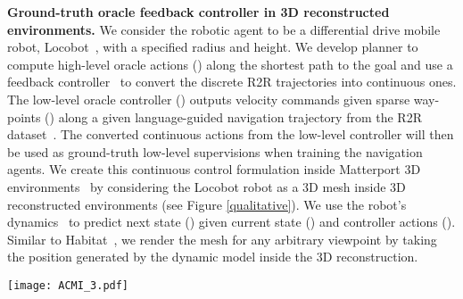 \documentclass[letter, 10pt, conference]{ieeeconf}
\begin{document}
\textbf{Ground-truth oracle feedback controller in 3D reconstructed environments.}
We consider the robotic agent to be a differential drive mobile robot, Locobot~\cite{pyrobot2019}, with a specified radius and height. We develop  planner to compute high-level oracle actions () along the shortest path to the goal and use a feedback controller~\cite{9780133496598} to convert the discrete R2R trajectories \cite{mattersim} into continuous ones.
The low-level oracle controller () outputs velocity commands  given sparse way-points () along a given language-guided navigation trajectory from the R2R dataset~\cite{Matterport3D}.
The converted continuous actions from the low-level controller will then be used as ground-truth low-level supervisions  when training the navigation agents.
We create this continuous control formulation inside Matterport 3D environments~\cite{Matterport3D} by considering the Locobot robot as a 3D mesh inside 3D reconstructed environments (see Figure \ref{qualitative}).
We use the robot's dynamics~\cite{10.5555/1855026} to predict next state () given current state () and controller actions (). 
Similar to Habitat~\cite{habitat19iccv}, we render the mesh for any arbitrary viewpoint by taking the position generated by the dynamic model inside the 3D reconstruction.

\begin{comment}
\begin{figure}[t!]
\centering
\texttt{[image: navigable.pdf]}
\label{navigable}
\caption{Exploration of environment using optimal control supervisions}
\end{figure}
\end{comment}

\begin{figure*}[t!]
\centering
\texttt{[image: ACMI\_3.pdf]}
\label{framework}
\end{figure*}
\end{document}
